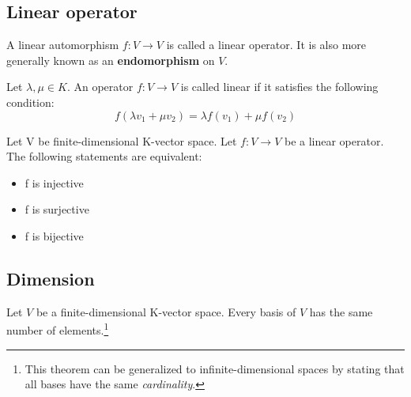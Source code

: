 \subsection{Linear operator}

    	\begin{definition}
	    	A linear automorphism $f: V \rightarrow V$ is called a linear operator. It is also more generally known as an \textbf{endomorphism} on $V$.
	\end{definition}
    	\begin{property}
		Let $\lambda, \mu \in K$. An operator $f: V \rightarrow V$ is called linear if it satisfies the following condition:
	        \begin{equation}
			\label{linalgebra:operators:linearity}
        	        f(\lambda v_1 + \mu v_2) = \lambda f(v_1) + \mu f(v_2)
		\end{equation}
	\end{property}
        
        \begin{theorem}
		Let V be finite-dimensional K-vector space. Let $f:V\rightarrow V$ be a linear operator. The following statements are equivalent:
        	\begin{itemize}
            		\item f is injective
			\item f is surjective
                	\item f is bijective
		\end{itemize}
	\end{theorem}
        
\subsection{Dimension}

        \begin{property}
		Let $V$ be a finite-dimensional K-vector space. Every basis of $V$ has the same number of elements.\footnote{This theorem can be generalized to infinite-dimensional spaces by stating that all bases have the same \textit{cardinality}.}
	\end{property}

